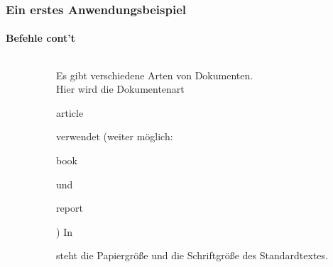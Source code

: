 \begin{frame}
\frametitle{Ein erstes Anwendungsbeispiel}
\framesubtitle{Befehle cont't}
\begin{columns}
\begin{column}{0.6\textwidth}
\begin{ttfamily}\scriptsize

\end{ttfamily}
\end{column}

\begin{column}{0.4\textwidth}
Es gibt verschiedene Arten von Dokumenten.\\ Hier wird die Dokumentenart
\begin{ttfamily}article\end{ttfamily} verwendet (weiter möglich:
\begin{ttfamily}book\end{ttfamily} und \begin{ttfamily}report\end{ttfamily}) In
\begin{ttfamily}[]\end{ttfamily} steht die Papiergröße und die Schriftgröße des
Standardtextes.\\
\end{column}
\end{columns}
\end{frame}

